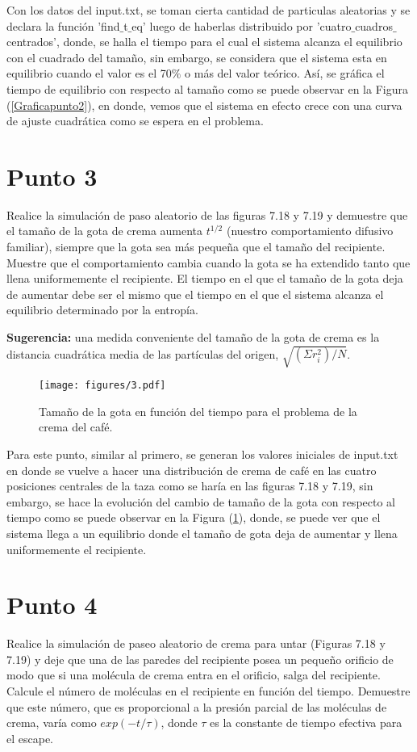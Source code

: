 \documentclass{article}
\begin{document}
    Con los datos del input.txt, se toman cierta cantidad de particulas aleatorias y se declara la función 'find$\_$t$\_$eq' luego de haberlas distribuido por 'cuatro$\_$cuadros$\_$centrados', donde, se halla el tiempo para el cual el sistema alcanza el equilibrio con el cuadrado del tamaño, sin embargo, se considera que el sistema esta en equilibrio cuando el valor es el 70$\%$ o más del valor teórico. Así, se gráfica el tiempo de equilibrio con respecto al tamaño como se puede observar en la Figura (\ref{Graficapunto2}), en donde, vemos que el sistema en efecto crece con una curva de ajuste cuadrática como se espera en el problema.
\section*{Punto 3}
    Realice la simulación de paso aleatorio de las figuras 7.18 y 7.19 y demuestre que el tamaño de la gota de crema aumenta $t^{1/2}$ (nuestro comportamiento difusivo familiar), siempre que la gota sea más pequeña que el tamaño del recipiente. Muestre que el comportamiento cambia cuando la gota se ha extendido tanto que llena uniformemente el recipiente. El tiempo en el que el tamaño de la gota deja de aumentar debe ser el mismo que el tiempo en el que el sistema alcanza el equilibrio determinado por la entropía.
    
    \textbf{Sugerencia:} una medida conveniente del tamaño de la gota de crema es la distancia cuadrática media de las partículas del origen, $\sqrt{\left(\Sigma r_{i}^{2}\right)/N}$.

        \begin{figure}[h]
        \centering
        \texttt{[image: figures/3.pdf]}
        \caption{Tamaño de la gota en función del tiempo para el problema de la crema del café.}
        \label{Graficapunto3}
    \end{figure}

    Para este punto, similar al primero, se generan los valores iniciales de input.txt en donde se vuelve a hacer una distribución de crema de café en las cuatro posiciones centrales de la taza como se haría en las figuras 7.18 y 7.19, sin embargo, se hace la evolución del cambio de tamaño de la gota con respecto al tiempo como se puede observar en la Figura (\ref{Graficapunto3}), donde, se puede ver que el sistema llega a un equilibrio donde el tamaño de gota deja de aumentar y llena uniformemente el recipiente.
\section*{Punto 4}
    Realice la simulación de paseo aleatorio de crema para untar (Figuras 7.18 y 7.19) y deje que una de las paredes del recipiente posea un pequeño orificio de modo que si una molécula de crema entra en el orificio, salga del recipiente. Calcule el número de moléculas en el recipiente en función del tiempo. Demuestre que este número, que es proporcional a la presión parcial de las moléculas de crema, varía como $exp\left(-t/\tau\right)$, donde $\tau$ es la constante de tiempo efectiva para el escape. 
    
\end{document}
